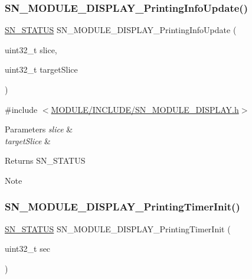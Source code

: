 \subsubsection{\texorpdfstring{S\+N\+\_\+\+M\+O\+D\+U\+L\+E\+\_\+\+D\+I\+S\+P\+L\+A\+Y\+\_\+\+Printing\+Info\+Update()}{SN\_MODULE\_DISPLAY\_PrintingInfoUpdate()}}
{\footnotesize\ttfamily \hyperlink{group__SYSTEM__ERROR_ga4540713b9a7a18ce44d78c3a10f7442f}{S\+N\+\_\+\+S\+T\+A\+T\+US} S\+N\+\_\+\+M\+O\+D\+U\+L\+E\+\_\+\+D\+I\+S\+P\+L\+A\+Y\+\_\+\+Printing\+Info\+Update (\begin{DoxyParamCaption}\item[{uint32\+\_\+t}]{slice,  }\item[{uint32\+\_\+t}]{target\+Slice }\end{DoxyParamCaption})}



{\ttfamily \#include $<$\hyperlink{SN__MODULE__DISPLAY_8h}{M\+O\+D\+U\+L\+E/\+I\+N\+C\+L\+U\+D\+E/\+S\+N\+\_\+\+M\+O\+D\+U\+L\+E\+\_\+\+D\+I\+S\+P\+L\+A\+Y.\+h}$>$}


\begin{DoxyParams}{Parameters}
{\em slice} & \\
\hline
{\em target\+Slice} & \\
\hline
\end{DoxyParams}
\begin{DoxyReturn}{Returns}
S\+N\+\_\+\+S\+T\+A\+T\+US 
\end{DoxyReturn}
\begin{DoxyNote}{Note}

\end{DoxyNote}
\mbox{\label{group__MODULE__DISPLAY_gac630c6bd386295f3008bc04e8b9c92a0}} 
\subsubsection{\texorpdfstring{S\+N\+\_\+\+M\+O\+D\+U\+L\+E\+\_\+\+D\+I\+S\+P\+L\+A\+Y\+\_\+\+Printing\+Timer\+Init()}{SN\_MODULE\_DISPLAY\_PrintingTimerInit()}}
{\footnotesize\ttfamily \hyperlink{group__SYSTEM__ERROR_ga4540713b9a7a18ce44d78c3a10f7442f}{S\+N\+\_\+\+S\+T\+A\+T\+US} S\+N\+\_\+\+M\+O\+D\+U\+L\+E\+\_\+\+D\+I\+S\+P\+L\+A\+Y\+\_\+\+Printing\+Timer\+Init (\begin{DoxyParamCaption}\item[{uint32\+\_\+t}]{sec }\end{DoxyParamCaption})}



